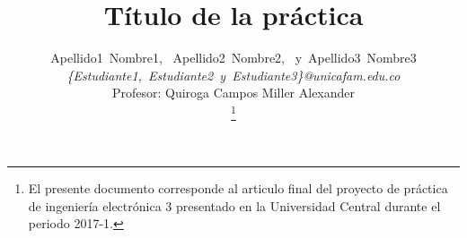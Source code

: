 \title{Título de la práctica}
\author{Apellido1~Nombre1,~
        Apellido2~Nombre2,~
        y~Apellido3~Nombre3\\
				\textit{\{Estudiante1,~Estudiante2~y~Estudiante3\}@unicafam.edu.co}\\
				Profesor: Quiroga Campos Miller Alexander\\%
\thanks{El presente documento corresponde al articulo final del proyecto de práctica de ingeniería electrónica 3 presentado en la Universidad Central durante el periodo 2017-1.}} %
